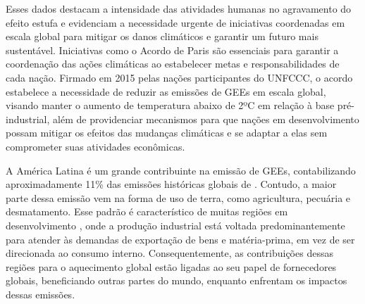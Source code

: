 Esses dados destacam a intensidade das atividades humanas no agravamento do efeito estufa e evidenciam a necessidade
urgente de iniciativas coordenadas em escala global para mitigar os danos climáticos e garantir um futuro mais
sustentável. Iniciativas como o Acordo de Paris \cite{paris} são essenciais para garantir a coordenação das ações
climáticas ao estabelecer metas e responsabilidades de cada nação. Firmado em 2015 pelas nações participantes do UNFCCC,
o acordo estabelece a necessidade de reduzir as emissões de GEEs em escala global, visando manter o aumento de
temperatura abaixo de 2ºC em relação à base pré-industrial, além de providenciar mecanismos para que nações em
desenvolvimento possam mitigar os efeitos das mudanças climáticas e se adaptar a elas sem comprometer suas atividades
econômicas.


A América Latina é um grande contribuinte na emissão de GEEs, contabilizando aproximadamente 11\% das emissões
históricas globais de  \cite{friedlingstein}. Contudo, a maior parte dessa emissão vem na forma de uso de terra,
como agricultura, pecuária e desmatamento. Esse padrão é característico de muitas regiões em desenvolvimento
\cite{ipcc_ar6_wg2_chap11}, onde a produção industrial está voltada predominantemente para atender às demandas de
exportação de bens e matéria-prima, em vez de ser direcionada ao consumo interno. Consequentemente, as contribuições
dessas regiões para o aquecimento global estão ligadas ao seu papel de fornecedores globais, beneficiando outras partes
do mundo, enquanto enfrentam os impactos dessas emissões.


